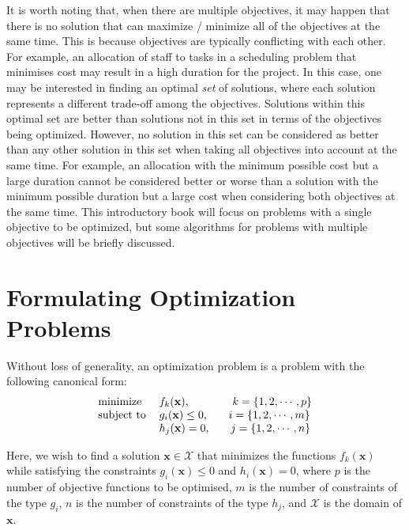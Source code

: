 It is worth noting that, when there are multiple objectives, it may happen that there is no solution that can maximize / minimize all of the objectives at the same time. This is because objectives are typically conflicting with each other. For example, an allocation of staff to tasks in a scheduling problem that minimises cost may result in a high duration for the project. In this case, one may be interested in finding an optimal \textit{set} of solutions, where each solution represents a different trade-off among the objectives. Solutions within this optimal set are better than solutions not in this set in terms of the objectives being optimized. However, no solution in this set can be considered as better than any other solution in this set when taking all objectives into account at the same time. For example, an allocation with the minimum possible cost but a large duration cannot be considered better or worse than a solution with the minimum possible duration but a large cost when considering both objectives at the same time. This introductory book will focus on problems with a single objective to be optimized, but some algorithms for problems with multiple objectives will be briefly discussed.


\section{Formulating Optimization Problems}
\label{sec:formulation}

Without loss of generality, an optimization problem is a problem with the following canonical form:
\[
\begin{tabular}{ll}
minimize        & $f_k(\mathbf{x})$, \ \ \ \ \ \ \ \ \ \ \ $k=\{1,2,\cdots,p\}$ \\ 
subject to      & $g_i(\mathbf{x}) \leq 0$, \ \ \ \ \ $i=\{1,2,\cdots,m\}$ \\
                & $h_j(\mathbf{x}) = 0$, \ \ \ \ \ $j=\{1,2,\cdots,n\}$ \\
\end{tabular}
\]

Here, we wish to find a solution $\mathbf{x} \in \mathcal{X}$ that minimizes the functions $f_k(\mathbf{x})$ while satisfying the constraints $g_i(\mathbf{x}) \leq 0$ and $h_i(\mathbf{x}) = 0$, where $p$ is the number of objective functions to be optimised, $m$ is the number of constraints of the type $g_i$, $n$ is the number of constraints of the type $h_j$, and $\mathcal{X}$ is the domain of $\mathbf{x}$. 


